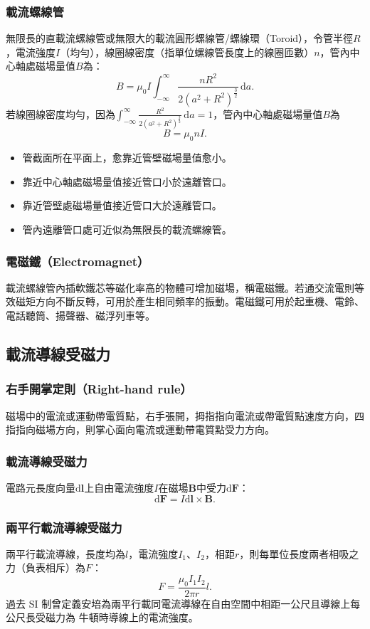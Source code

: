 \documentclass[a4paper,12pt]{report}
\begin{document}
\begin{itemize}
\subsubsection{載流螺線管}
無限長的直載流螺線管或無限大的載流圓形螺線管/螺線環（Toroid），令管半徑$R$，電流強度$I$（均勻），線圈線密度（指單位螺線管長度上的線圈匝數）$n$，管內中心軸處磁場量值$B$為：
\[B=\mu_0I\int_{-\infty}^{\infty}\frac{nR^2}{2(a^2+R^2)^{\frac{3}{2}}}\,\mathrm{d}a.\]
若線圈線密度均勻，因為$\int_{-\infty}^{\infty}\frac{R^2}{2(a^2+R^2)^{\frac{3}{2}}}\,\mathrm{d}a=1$，管內中心軸處磁場量值$B$為
\[B=\mu_0nI.\]
\begin{itemize}
\item 管截面所在平面上，愈靠近管壁磁場量值愈小。
\item 靠近中心軸處磁場量值接近管口小於遠離管口。
\item 靠近管壁處磁場量值接近管口大於遠離管口。
\item 管內遠離管口處可近似為無限長的載流螺線管。
\end{itemize}
\subsubsection{電磁鐵（Electromagnet）}
載流螺線管內插軟鐵芯等磁化率高的物體可增加磁場，稱電磁鐵。若通交流電則等效磁矩方向不斷反轉，可用於產生相同頻率的振動。電磁鐵可用於起重機、電鈴、電話聽筒、揚聲器、磁浮列車等。
\subsection{載流導線受磁力}
\subsubsection{右手開掌定則（Right-hand rule）}
磁場中的電流或運動帶電質點，右手張開，拇指指向電流或帶電質點速度方向，四指指向磁場方向，則掌心面向電流或運動帶電質點受力方向。
\subsubsection{載流導線受磁力}
電路元長度向量$\mathrm{d}\mathbf{l}$上自由電流強度$I$在磁場$\mathbf{B}$中受力$\mathrm{d}\mathbf{F}$：
\[\mathrm{d}\mathbf{F}=I\mathrm{d}\mathbf{l}\times\mathbf{B}.\]
\subsubsection{兩平行載流導線受磁力}
兩平行載流導線，長度均為$l$，電流強度$I_1$、$I_2$，相距$r$，則每單位長度兩者相吸之力（負表相斥）為$F$：
\[F=\frac{\mu_0I_1I_2}{2\pi r}l.\]
過去 SI 制曾定義安培為兩平行載同電流導線在自由空間中相距一公尺且導線上每公尺長受磁力為  牛頓時導線上的電流強度。

\end{itemize}
\end{document}
